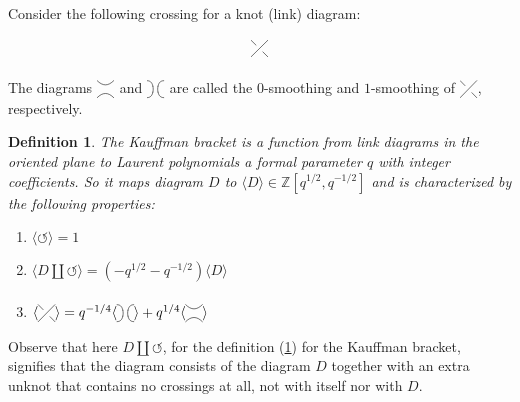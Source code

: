 \documentclass[a4paper,titlepage,twoside]{book}
\newtheorem{lemma}{Lemma}
\newtheorem{definition}{Definition}
\begin{document}
Consider the following crossing for a knot (link) diagram: 
\[
\xygraph{ 
  !{0;/r1.0pc/:}
  [u(0.5)]
  !{\xoverv}
  }
\]

The  diagrams $\xygraph{
  !{0;/r1.0pc/:}
  [u(0.5)]
  !{\xunoverh} }$ and $\xygraph{
    !{0;/r1.0pc/:}
    [u(0.5)]
    !{\huncross}
    }$ are called the $0$-smoothing and $1$-smoothing of  $\xygraph{ 
  !{0;/r1.0pc/:}
  [u(0.5)]
  !{\xoverv}
  }$, respectively.  




\begin{definition}
  The Kauffman bracket is a function from link diagrams in the oriented plane to Laurent polynomials a formal parameter $q$ with integer coefficients.  So it maps diagram $D$ to $\langle D \rangle \in \mathbb{Z}[q^{1/2}, q^{-1/2}]$ and is characterized by the following properties:
\begin{enumerate}
\item[(i)] $\langle \circlearrowleft \rangle = 1$
\item[(ii)] $\langle D \coprod \circlearrowleft \rangle = ( - q^{1/2} - q^{-1/2}) \langle D \rangle$
\item[(iii)] $\langle \xygraph{ 
  !{0;/r1.0pc/:}
  [u(0.5)]
  !{\xoverv}
  }
  \rangle = q^{-1/4} \langle \xygraph{
    !{0;/r1.0pc/:}
    [u(0.5)]
    !{\huncross}
    }
\rangle + q^{1/4} \langle \xygraph{
  !{0;/r1.0pc/:}
  [u(0.5)]
  !{\xunoverh} }
\rangle$
\end{enumerate} \label{Def:KauffmanBracket}
\end{definition}
Observe that here $D\coprod \circlearrowleft$, for the definition (\ref{Def:KauffmanBracket}) for the Kauffman bracket, signifies that the diagram consists of the diagram $D$ together with an extra unknot that contains no crossings at all, not with itself nor with $D$.  

\end{document}
